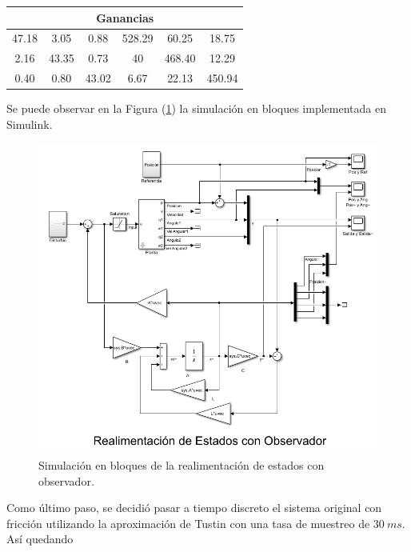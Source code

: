 \begin{table}[H]
\centering
\begin{tabular}{@{}cccccc@{}}
\toprule
\multicolumn{6}{c}{Ganancias}                    \\ \midrule
47.18 & 3.05  & 0.88  & 528.29 & 60.25  & 18.75  \\
2.16  & 43.35 & 0.73  & 40     & 468.40 & 12.29  \\
0.40  & 0.80  & 43.02 & 6.67   & 22.13  & 450.94 \\ \bottomrule
\end{tabular}
\end{table}

Se puede observar en la Figura (\ref{fig:obsv}) la simulación en bloques implementada en Simulink.

\begin{figure}[H]
	\centering
	\includegraphics[width=\linewidth]{../Modelo de Control/ImagenesModelo de Control/obsv.png}
	\caption{Simulación en bloques de la realimentación de estados con observador.}	
	\label{fig:obsv}
\end{figure}


Como último paso, se decidió pasar a tiempo discreto el sistema original con fricción utilizando la aproximación de Tustin con una tasa de muestreo de $30 \ ms$. Así quedando

